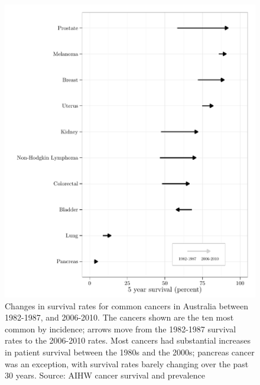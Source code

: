 \documentclass[thesis.tex]{subfiles}
\begin{document}
\begin{figure}[!htbp]
\centering
\includegraphics[width=.9\linewidth]{analysis/intro/figure/historical-survival-all-1}
\caption[Historical survival rates of common cancers]{Changes in survival rates for common cancers in Australia between 1982-1987, and 2006-2010.  The cancers shown are the ten most common by incidence; arrows move from the 1982-1987 survival rates to the 2006-2010 rates.  Most cancers had substantial increases in patient survival between the 1980s and the 2000s; pancreas cancer was an exception, with survival rates barely changing over the past 30 years.  Source: AIHW cancer survival and prevalence \cite{CAN65}}\label{fig:intro-historical-all-surv}
\end{figure}
\end{document}
